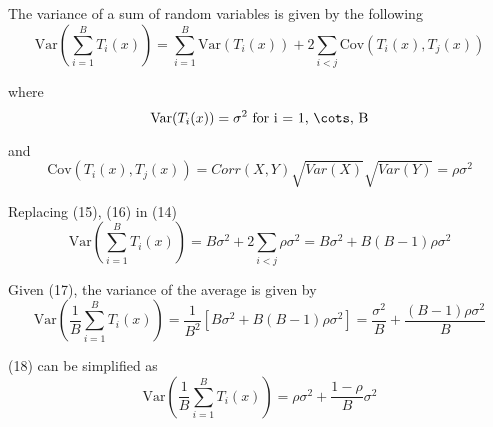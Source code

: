 \begin{answer}

The variance of a sum of random variables is given by the following
\begin{equation}
    \text{Var}\left(\sum_{i=1}^{B} T_i(x)\right) = \sum_{i=1}^{B} \text{Var}(T_i(x)) + 2\sum_{i<j} \text{Cov}(T_i(x), T_j(x))
\end{equation}

where
\begin{equation}
    \text{Var}(T_i(x)) = \sigma^2\ \text{for i = 1, \cots, B}
\end{equation}

and 
\begin{equation}
    \text{Cov}(T_i(x), T_j(x)) =  Corr(X,Y) \sqrt{Var(X)}\sqrt{Var(Y)} = \rho\sigma^2
\end{equation}

Replacing (15), (16) in (14)
\begin{equation}
\text{Var}\left(\sum_{i=1}^{B} T_i(x)\right) = B\sigma^2 + 2\sum_{i<j} \rho\sigma^2 = B\sigma^2 + B(B-1)\rho\sigma^2
\end{equation}

Given (17), the variance of the average is given by 
\begin{equation}
\text{Var}\left(\frac{1}{B}\sum_{i=1}^{B}T_i(x)\right) = \frac{1}{B^2}\left[B\sigma^2 + B(B-1)\rho\sigma^2\right] = \frac{\sigma^2}{B} + \frac{(B-1)\rho\sigma^2}{B}
\end{equation}

(18) can be simplified as 
\begin{equation}
\text{Var}\left(\frac{1}{B}\sum_{i=1}^{B}T_i(x)\right) = \rho\sigma^2 + \frac{1-\rho}{B}\sigma^2
\end{equation}

\end{answer}